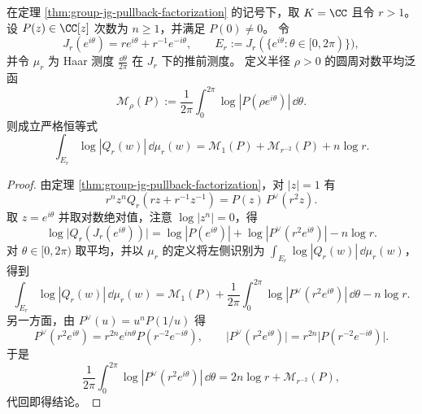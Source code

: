 \begin{theorem}\label{thm:group-jg-elliptic-two-scale-stokes-mean}
在定理 \ref{thm:group-jg-pullback-factorization} 的记号下，取 \(K=\CC\) 且令 \(r>1\)。
设 \(P(z)\in\CC[z]\) 次数为 \(n\ge 1\)，并满足 \(P(0)\neq 0\)。
令
\[
J_r(e^{i\theta})=r e^{i\theta}+r^{-1}e^{-i\theta},
\qquad
E_r:=J_r(\{e^{i\theta}:\theta\in[0,2\pi)\}),
\]
并令 \(\mu_r\) 为 Haar 测度 \(\frac{\dd\theta}{2\pi}\) 在 \(J_r\) 下的推前测度。
定义半径 \(\rho>0\) 的圆周对数平均泛函
\[
\mathcal M_\rho(P):=\frac1{2\pi}\int_{0}^{2\pi}\log|P(\rho e^{i\theta})|\,\dd\theta.
\]
则成立严格恒等式
\[
\boxed{\;
\int_{E_r}\log|Q_r(w)|\,\dd\mu_r(w)
=
\mathcal M_{1}(P)+\mathcal M_{r^{-2}}(P)+n\log r.
\;}
\]
\end{theorem}
\begin{proof}
由定理 \ref{thm:group-jg-pullback-factorization}，对 \(|z|=1\) 有
\[
r^n z^n Q_r\!\left(r z+r^{-1}z^{-1}\right)=P(z)\,P^{\vee}(r^2 z).
\]
取 \(z=e^{i\theta}\) 并取对数绝对值，注意 \(\log|z^n|=0\)，得
\[
\log\bigl|Q_r(J_r(e^{i\theta}))\bigr|
=
\log|P(e^{i\theta})|+\log|P^\vee(r^2 e^{i\theta})|-n\log r.
\]
对 \(\theta\in[0,2\pi)\) 取平均，并以 \(\mu_r\) 的定义将左侧识别为 \(\int_{E_r}\log|Q_r(w)|\,\dd\mu_r(w)\)，得到
\[
\int_{E_r}\log|Q_r(w)|\,\dd\mu_r(w)
=\mathcal M_1(P)+\frac1{2\pi}\int_{0}^{2\pi}\log|P^\vee(r^2 e^{i\theta})|\,\dd\theta-n\log r.
\]
另一方面，由 \(P^\vee(u)=u^nP(1/u)\) 得
\[
P^\vee(r^2 e^{i\theta})=r^{2n}e^{in\theta}P(r^{-2}e^{-i\theta}),
\qquad
\bigl|P^\vee(r^2 e^{i\theta})\bigr|=r^{2n}\bigl|P(r^{-2}e^{-i\theta})\bigr|.
\]
于是
\[
\frac1{2\pi}\int_{0}^{2\pi}\log|P^\vee(r^2 e^{i\theta})|\,\dd\theta
=2n\log r+\mathcal M_{r^{-2}}(P),
\]
代回即得结论。
\end{proof}


